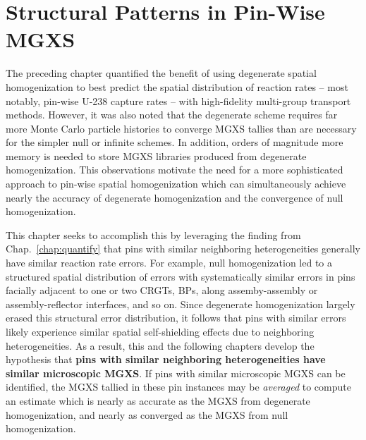 \chapter{Structural Patterns in Pin-Wise MGXS}
\label{chap:spatial}

The preceding chapter quantified the benefit of using degenerate spatial homogenization to best predict the spatial distribution of reaction rates -- most notably, pin-wise U-238 capture rates -- with high-fidelity multi-group transport methods. However, it was also noted that the degenerate scheme requires far more Monte Carlo particle histories to converge \ac{MGXS} tallies than are necessary for the simpler null or infinite schemes. In addition, orders of magnitude more memory is needed to store \ac{MGXS} libraries produced from degenerate homogenization. This observations motivate the need for a more sophisticated approach to pin-wise spatial homogenization which can simultaneously achieve nearly the accuracy of degenerate homogenization and the convergence of null homogenization.

This chapter seeks to accomplish this by leveraging the finding from Chap.~\ref{chap:quantify} that pins with similar neighboring heterogeneities generally have similar reaction rate errors. For example, null homogenization led to a structured spatial distribution of errors with systematically similar errors in pins facially adjacent to one or two \acp{CRGT}, \acp{BP}, along assemby-assembly or assembly-reflector interfaces, and so on. Since degenerate homogenization largely erased this structural error distribution, it follows that pins with similar errors likely experience similar spatial self-shielding effects due to neighboring heterogeneities. As a result, this and the following chapters develop the hypothesis that \textbf{pins with similar neighboring heterogeneities have similar microscopic \ac{MGXS}}. If pins with similar microscopic \ac{MGXS} can be identified, the \ac{MGXS} tallied in these pin instances may be \textit{averaged} to compute an estimate which is nearly as accurate as the \ac{MGXS} from degenerate homogenization, and nearly as converged as the \ac{MGXS} from null homogenization. 

